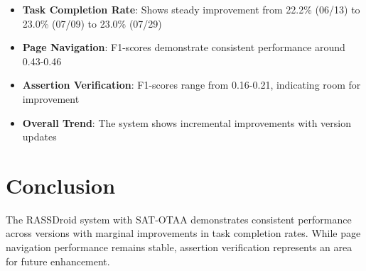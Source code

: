 \documentclass{article}
\begin{document}
\begin{itemize}
\item \textbf{Task Completion Rate}: Shows steady improvement from 22.2\% (06/13) to 23.0\% (07/09) to 23.0\% (07/29)
\item \textbf{Page Navigation}: F1-scores demonstrate consistent performance around 0.43-0.46
\item \textbf{Assertion Verification}: F1-scores range from 0.16-0.21, indicating room for improvement
\item \textbf{Overall Trend}: The system shows incremental improvements with version updates
\end{itemize}

\section{Conclusion}

The RASSDroid system with SAT-OTAA demonstrates consistent performance across versions with marginal improvements in task completion rates. While page navigation performance remains stable, assertion verification represents an area for future enhancement.
\end{document}
